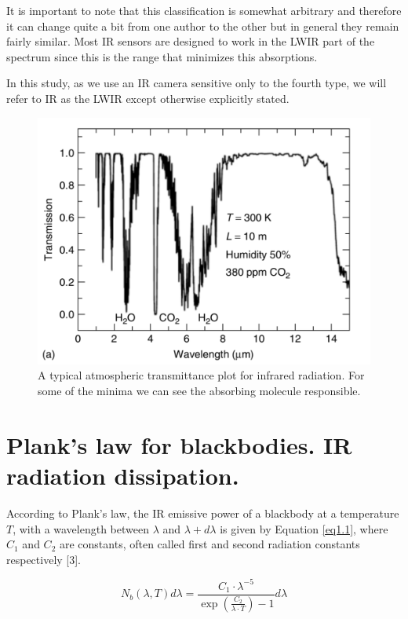 		It is important to note that this classification is somewhat arbitrary and therefore it can change quite a bit from one author to the other but in general they remain fairly similar. Most IR sensors are designed to work in the LWIR part of the spectrum since this is the range that minimizes this absorptions.
		
		In this study, as we use an IR camera sensitive only to the fourth type, we will refer to IR as the LWIR except otherwise explicitly stated.
		
		\begin{figure}[ht!]
			\centering
			\captionsetup{justification=centering,margin=2cm}
			\includegraphics[scale=0.45]{Figures/Chapter01/Transmission.pdf}
			\caption{A typical atmospheric transmittance plot  for infrared radiation. For some of the minima we can see the absorbing molecule responsible.}\label{fig1.2}
		\end{figure}
		
	\section{Plank's law for blackbodies. IR radiation dissipation.}\label{section1.2}
	
		According to Plank's law, the IR emissive power of a blackbody at a temperature $T$, with a wavelength between $\lambda$ and $\lambda+d\lambda$ is given by Equation \ref{eq1.1}, where $C_{1}$ and $C_{2}$ are constants, often called first and second radiation constants respectively [3].
		
		\begin{equation}\label{eq1.1}
			N_{b}(\lambda,T)d\lambda=\frac{C_{1} \cdot \lambda^{-5}}{\exp (\frac{C_{2}}{\lambda\cdot T}) -1} d\lambda
		\end{equation}
		
